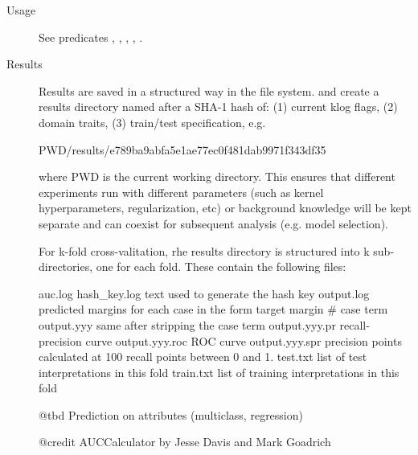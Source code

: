 \begin{description}
    \item[Usage] 
See predicates , , ,
, .
    \item[Results] 
Results are saved in a structured way in the file system. 
and  create a results directory named after a SHA-1
hash of: (1) current klog flags, (2) domain traits, (3) train/test
specification, e.g.

\begin{code}
PWD/results/e789ba9abfa5e1ae77ec0f481dab9971f343df35
\end{code}

where PWD is the current working directory. This ensures that
different experiments run with different parameters (such as kernel
hyperparameters, regularization, etc) or background knowledge will
be kept separate and can coexist for subsequent analysis (e.g. model
selection).

For k-fold cross-valitation, rhe results directory is structured
into k sub-directories, one for each fold. These contain the
following files:

\begin{code}
auc.log
hash_key.log      text used to generate the hash key
output.log        predicted margins for each case in the form target margin # case term
output.yyy        same after stripping the case term
output.yyy.pr     recall-precision curve
output.yyy.roc    ROC curve
output.yyy.spr    precision points calculated at 100 recall points between 0 and 1.
test.txt          list of test interpretations in this fold
train.txt         list of training interpretations in this fold
\end{code}

@tbd Prediction on attributes (multiclass, regression)

@credit AUCCalculator by Jesse Davis and Mark Goadrich
\end{description}

\vspace{0.7cm}

